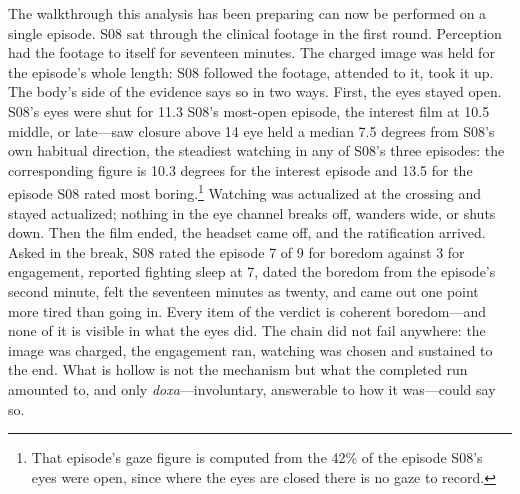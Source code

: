 The walkthrough this analysis has been preparing can now be performed on a single episode. S08
sat through the clinical footage in the first round. Perception had the footage to itself for
seventeen minutes. The charged image was held for the episode's whole length: S08 followed the
footage, attended to it, took it up. The body's side of the evidence says so in two ways.
First, the eyes stayed open. S08's eyes were shut for 11.3%
S08's most-open episode, the interest film at 10.5%
middle, or late---saw closure above 14%
eye held a median 7.5 degrees from S08's own habitual direction, the steadiest watching in any
of S08's three episodes: the corresponding figure is 10.3 degrees for the interest episode and
13.5 for the episode S08 rated most boring.\footnote{That episode's gaze figure is computed
from the 42\% of the episode S08's eyes were open, since where the eyes are closed there is no
gaze to record.} Watching was actualized at the crossing and stayed actualized; nothing in the eye
channel breaks off, wanders wide, or shuts down. Then the film ended, the headset came off, and
the ratification arrived. Asked in the break, S08 rated the episode 7 of 9 for boredom against
3 for engagement, reported fighting sleep at 7, dated the boredom from the episode's second
minute, felt the seventeen minutes as twenty, and came out one point more tired than going in.
Every item of the verdict is coherent boredom---and none of it is visible in what the eyes did.
The chain did not fail anywhere: the image was charged, the engagement ran, watching was chosen
and sustained to the end. What is hollow is not the mechanism but what the completed run
amounted to, and only \textit{doxa}---involuntary, answerable to how it was---could say so.

